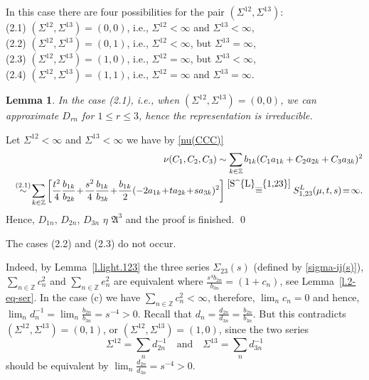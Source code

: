 \documentclass[preprint,12pt]{elsarticle}
\newtheorem{lem}[thm]{Lemma}
\numberwithin{equation}{section}
\begin{document}
In this case there are four  possibilities for the pair $(\Sigma^{12},\Sigma^{13})$:\\
(2.1)  $(\Sigma^{12},\Sigma^{13})=(0,0)$, i.e., $\Sigma^{12}<\infty$ and $\Sigma^{13}<\infty$, 
\\
(2.2)  $(\Sigma^{12},\Sigma^{13})=(0,1)$, i.e., $\Sigma^{12}<\infty$, but $\Sigma^{13}=\infty$,\\
(2.3)  $(\Sigma^{12},\Sigma^{13})=(1,0)$, i.e., $\Sigma^{12}=\infty$, but $\Sigma^{13}<\infty$,\\
(2.4)  $(\Sigma^{12},\Sigma^{13})=(1,1)$, i.e., $\Sigma^{12}=\infty$ and $\Sigma^{13}=\infty$.
\begin{lem}
\label{l.ex,011}
In the case {\rm (2.1)}, i.e.,  when $(\Sigma^{12},\Sigma^{13})=(0,0)$, we can approximate $D_{rn}$ for $1\leq r\leq 3$, hence the representation is irreducible. 
\end{lem}
%
\begin{pf}
Let $\Sigma^{12}<\infty$ and $\Sigma^{13}<\infty$ we have by \eqref{nu(CCC)}
\begin{eqnarray*}
&& \nu( C_1, C_2, C_3)
\sim \sum_{k\in \mathbb Z}b_{1k}(C_1a_{1k}+ C_2a_{2k}+C_3a_{3k})^2\\
&&\stackrel{(2.1)}{\sim} \!\sum_{k\in{\mathbb
Z}}\left[\frac{t^2}{4}\frac{b_{1k}}{b_{2k}}\!+\!\frac{s^2}{4}\frac{b_{1k}}{b_{3k}}\!+\!
\frac{b_{1k}}{2}(-2a_{1k}\!+\!ta_{2k}\!+\!sa_{3k})^2\right]
\stackrel{\eqref{S^{L}_{1,23}}}{=}
S^{L}_{1,23}(\mu,t,s)\!=\!\infty.
\end{eqnarray*}
%
Hence, $D_{1n},\,D_{2n},\,D_{3n}\,\,\eta\,\, {\mathfrak A}^3$ and the proof is finished.
%
\qed\end{pf}
\begin{rem}
\label{r.Sigma(123)=(0,1)}
The cases (2.2) and (2.3) do not  occur. 
\end{rem}
 Indeed, by Lemma~\ref{l.light.123} the three series $\Sigma_{23}(s)$ 
 (defined by \eqref{sigma-ij(s)}),  $\sum_{n\in \mathbb Z}c_n^2$ and 
$\sum_{n\in \mathbb Z}e_n^2$
are equivalent where $\frac{s^4b_{2n}}{b_{3n}}=(1+c_n)$, see Lemma~\ref{l.2-eq-ser}. In the case (c) we have $\sum_{n\in \mathbb Z}c_n^2<\infty$, therefore, $\lim_nc_n=0$ and hence, $\lim_nd_n^{-1}=\lim_n\frac{b_{2n}}{b_{3n}}=s^{-4}>0$. Recall that 
$d_n=\frac{d_{2n}}{d_{3n}}=\frac{b_{2n}}{b_{3n}}
$.
But this contradicts $(\Sigma^{12},\Sigma^{13})=(0,1)$, or $(\Sigma^{12},\Sigma^{13})=(1,0)$, since the two series
$$
\Sigma^{12}=\sum_nd_{2n}^{-1}\quad\text{and}\quad
\Sigma^{13}=\sum_nd_{3n}^{-1}
$$
should be equivalent by 
$\lim_n\frac{d_{2n}}{d_{3n}}=s^{-4}>0$.
\end{document}
